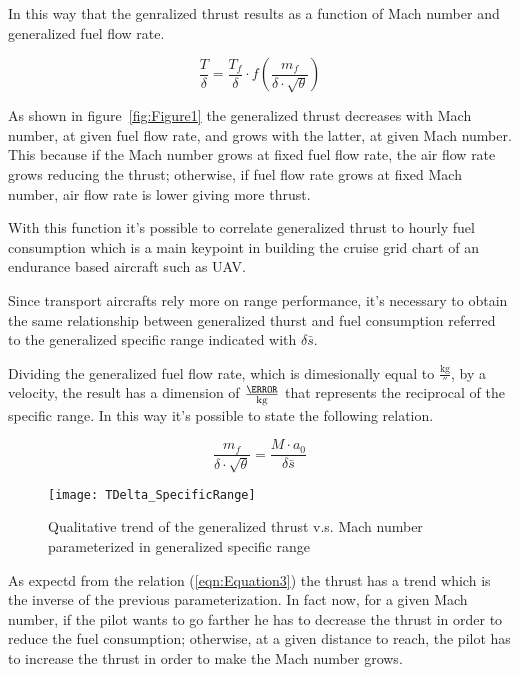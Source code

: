 \noindent
In this way that the genralized thrust results as a function of Mach number and generalized fuel flow rate.

\begin{equation}
\frac{T}{\delta}=\frac{T_{f}}{\delta}\cdot f\left(\frac{m_{f}}{\delta \cdot \sqrt{\theta}}\right)
\label{eqn:Equation2}
\end{equation}

\bigskip
\noindent
As shown in figure~\ref{fig:Figure1} the generalized thrust decreases with Mach number, at given fuel flow rate, and grows with the latter, at given Mach number. This because if the Mach number grows at fixed fuel flow rate, the air flow rate grows reducing the thrust; otherwise, if fuel flow rate grows at fixed Mach number, air flow rate is lower giving more thrust.

With this function it's possible to correlate generalized thrust to hourly fuel consumption which is a main keypoint in building the cruise grid chart of an endurance based aircraft such as UAV. 

Since transport aircrafts rely more on range performance, it's necessary to obtain the same relationship between generalized thurst and fuel consumption referred to the generalized specific range indicated with $\delta\bar s $. 

\bigskip
\noindent
Dividing the generalized fuel flow rate, which is dimesionally equal to $\frac{\si{\kilogram}}{\second}$, by a velocity, the result has a dimension of $\frac{\meter}{\si{\kilogram}}$ that represents the reciprocal of the specific range. In this way it's possible to state the following relation.

\begin{equation}
\frac{m_{f}}{\delta \cdot \sqrt{\theta}}=\frac{M\cdot a_{0}}{\delta\bar s}
\label{eqn:Equation3}
\end{equation}

\begin{figure}[!ht]
\centering
\texttt{[image: TDelta\_SpecificRange]}
\caption{Qualitative trend of the generalized thrust v.s. Mach number parameterized in generalized specific range}
\label{fig:Figure2}
\end{figure}

\bigskip
\noindent
As expectd from the relation (\ref{eqn:Equation3}) the thrust has a trend which is the inverse of the previous parameterization. In fact now, for a given Mach number, if the pilot wants to go farther he has to decrease the thrust in order to reduce the fuel consumption; otherwise, at a given distance to reach, the pilot has to increase the thrust in order to make the Mach number grows.

